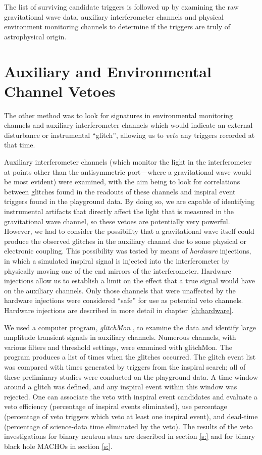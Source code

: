 The list of surviving candidate triggers is followed up by examining the raw
gravitational wave data, auxiliary interferometer channels and physical
environment monitoring channels to determine if the triggers are truly of
astrophysical origin.


\section{Auxiliary and Environmental Channel Vetoes}
\label{s:vetoes}

The other method was to look for signatures in environmental monitoring
channels and auxiliary interferometer channels which would indicate an
external disturbance or instrumental ``glitch'', allowing us to {\it veto} any
triggers recorded at that time.

Auxiliary interferometer channels (which monitor the light in the
interferometer at points other than the antisymmetric port---where a
gravitational wave would be most evident) were examined, with the aim being to
look for correlations between glitches found in the readouts of these channels
and inspiral event triggers found in the playground data.  By doing so, we are
capable of identifying instrumental artifacts that directly affect the light
that is measured in the gravitational wave channel, so these vetoes are
potentially very powerful.  However, we had to consider the possibility that a
gravitational wave itself could produce the observed glitches in the auxiliary
channel due to some physical or electronic coupling.  This possibility was
tested by means of {\em hardware} injections, in which a simulated inspiral
signal is injected into the interferometer by physically moving one of the end
mirrors of the interferometer. Hardware injections allow us to establish a
limit on the effect that a true signal would have on the auxiliary channels.
Only those channels that were unaffected by the hardware injections were
considered ``safe'' for use as potential veto channels. Hardware injections
are described in more detail in chapter \ref{ch:hardware}.

We used a computer program, {\it glitchMon} \cite{glitchMon}, to examine the
data and identify large amplitude transient signals in auxiliary channels.
Numerous channels, with various filters and threshold settings, were examined
with glitchMon. The program produces a list of times when the glitches
occurred. The glitch event list was compared with times generated by triggers
from the inspiral search; all of these preliminary studies were conducted on
the playground data. A time window around a glitch was defined, and any
inspiral event within this window was rejected. One can associate the veto
with inspiral event candidates and evaluate a veto efficiency (percentage of
inspiral events eliminated), use percentage (percentage of veto triggers which
veto at least one inspiral event), and dead-time (percentage of science-data
time eliminated by the veto). The results of the veto investigations for
binary neutron stars are described in section \ref{s:} and for binary black
hole MACHOs in section \ref{s:}.


